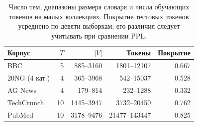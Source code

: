 \begin{table}[H]
\centering
\small
\caption{Число тем, диапазоны размера словаря и числа обучающих токенов на малых коллекциях. Покрытие тестовых токенов усреднено по девяти выборкам; его различия следует учитывать при сравнении PPL.}
\label{tab:data}
\begin{tabular}{lrrrr}
\toprule
Корпус & $T$ & $|V|$ & Токены & Покрытие \\
\midrule
BBC & 5 & 885--3160 & 1801--12107 & 0.667 \\
20NG (4 кат.) & 4 & 365--3968 & 542--15037 & 0.528 \\
AG News & 4 & 179--814 & 232--1288 & 0.332 \\
TechCrunch & 10 & 1445--3947 & 3732--20450 & 0.762 \\
PubMed & 10 & 3178--9476 & 21477--143447 & 0.825 \\
\bottomrule
\end{tabular}
\end{table}
